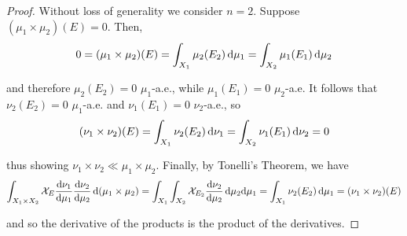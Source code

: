 \begin{proof}
    Without loss of generality we consider \(n=2\). Suppose \((\mu_1 \times \mu_2)(E) = 0\). Then, 
    \[
        0 
        = (\mu_1 \times \mu_2)(E) 
        = \int_{X_1} \mu_2(E_2) \, \mathrm{d}\mu_1
        = \int_{X_2} \mu_1(E_1) \, \mathrm{d}\mu_2
    \]

    and therefore \(\mu_2(E_2) = 0\) \(\mu_1\)-a.e., while \(\mu_1(E_1) = 0\) \(\mu_2\)-a.e. It follows that \(\nu_2(E_2) = 0\) \(\mu_1\)-a.e. and \(\nu_1(E_1) = 0\) \(\nu_2\)-a.e., so 
    \[
        (\nu_1 \times \nu_2)(E) = \int_{X_1} \nu_2(E_2) \, \mathrm{d}\nu_1 = \int_{X_2} \nu_1(E_1) \, \mathrm{d}\nu_2 = 0
    \]

    thus showing \(\nu_1 \times \nu_2 \ll \mu_1 \times \mu_2\). Finally, by Tonelli's Theorem, we have 
    \[
        \int_{X_1 \times X_2} \mathcal{X}_E \frac{\mathrm{d}\nu_1}{\mathrm{d}\mu_1} \frac{\mathrm{d}\nu_2}{\mathrm{d}\mu_2} \, \mathrm{d} (\mu_1 \times \mu_2)
        = \int_{X_1} \int_{X_2} \mathcal{X}_{E_2} \frac{\mathrm{d} \nu_2}{\mathrm{d} \mu_2} \, \mathrm{d} \mu_2 \mathrm{d}\mu_1 
        = \int_{X_1} \nu_2(E_2) \, \mathrm{d}\mu_1
        = (\nu_1 \times \nu_2)(E)
    \]

    and so the derivative of the products is the product of the derivatives. 
\end{proof}






